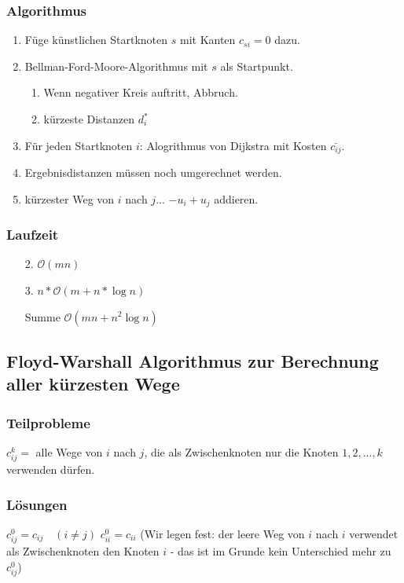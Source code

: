 \subsubsection{Algorithmus}
\begin{enumerate}
\item Füge künstlichen Startknoten $s$ mit Kanten $c_{si} = 0$ dazu.
\item Bellman-Ford-Moore-Algorithmus mit $s$ als Startpunkt.
\begin{enumerate}
\item Wenn negativer Kreis auftritt, Abbruch.
\item kürzeste Distanzen $d_i^*$
\end{enumerate}
\item Für jeden Startknoten $i$: Alogrithmus von Dijkstra mit Kosten $\bar{c_{ij}}$.
\item Ergebnisdistanzen müssen noch umgerechnet werden.
\item kürzester Weg von $i$ nach $j$... $-u_i + u_j$ addieren.
\end{enumerate}
\subsubsection{Laufzeit}
\begin{enumerate}
\item[2.] $\mathcal{O}(mn)$
\item[3.] $n * \mathcal{O}(m+n*\log n)$
\item[Summe] $\mathcal{O}(mn+n^2\log n)$
\end{enumerate}
\subsection{Floyd-Warshall Algorithmus zur Berechnung aller kürzesten Wege}
\subsubsection{Teilprobleme}
$c_{ij}^k = $ alle Wege von $i$ nach $j$, die als Zwischenknoten nur die Knoten $1,2,...,k$ verwenden dürfen.
\subsubsection{Lösungen}
$c_{ij}^0 = c_{ij} \quad (i\neq j)$
$c_{ii}^0 = c_{ii} $ (Wir legen fest: der leere Weg von $i$ nach $i$ verwendet als Zwischenknoten den Knoten $i$ - das ist im Grunde kein Unterschied mehr zu $c_{ij}^0$)

